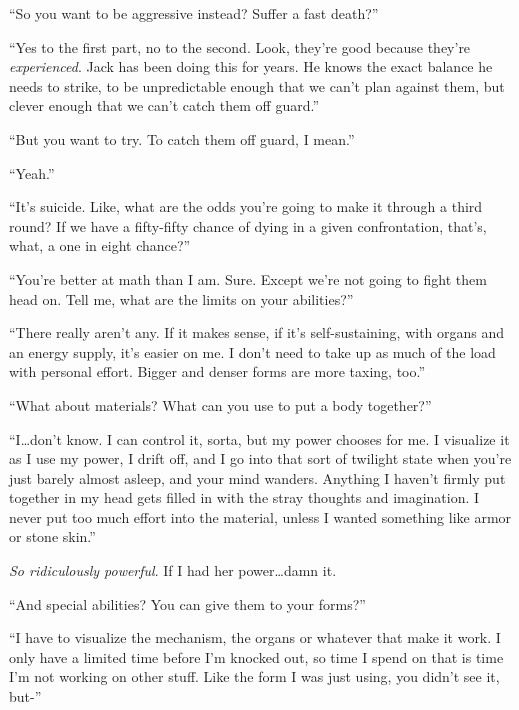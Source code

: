 ``So you want to be aggressive instead?  Suffer a fast death?''



``Yes to the first part, no to the second.  Look, they're good because they're \emph{experienced}.  Jack has been doing this for years.  He knows the exact balance he needs to strike, to be unpredictable enough that we can't plan against them, but clever enough that we can't catch them off guard.''



``But you want to try.  To catch them off guard, I mean.''



``Yeah.''



``It's suicide.  Like, what are the odds you're going to make it through a third round?  If we have a fifty-fifty chance of dying in a given confrontation, that's, what, a one in eight chance?''



``You're better at math than I am.  Sure.  Except we're not going to fight them head on.  Tell me, what are the limits on your abilities?''



``There really aren't any.  If it makes sense, if it's self-sustaining, with organs and an energy supply, it's easier on me.  I don't need to take up as much of the load with personal effort.  Bigger and denser forms are more taxing, too.''



``What about materials?  What can you use to put a body together?''



``I\ldots don't know.  I can control it, sorta, but my power chooses for me.  I visualize it as I use my power, I drift off, and I go into that sort of twilight state when you're just barely almost asleep, and your mind wanders.  Anything I haven't firmly put together in my head gets filled in with the stray thoughts and imagination.  I never put too much effort into the material, unless I wanted something like armor or stone skin.''



\emph{So ridiculously powerful}.  If I had her power\ldots damn it.



``And special abilities?  You can give them to your forms?''



``I have to visualize the mechanism, the organs or whatever that make it work.  I only have a limited time before I'm knocked out, so time I spend on that is time I'm not working on other stuff.  Like the form I was just using, you didn't see it, but-''



